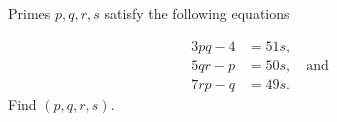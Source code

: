 Primes $p,q,r,s$ satisfy the following equations

\begin{align*}
3pq-4&=51s,\\
5qr-p&=50s,\quad\textrm{and}\\
7rp-q&=49s.
\end{align*}Find $(p,q,r,s)$.

